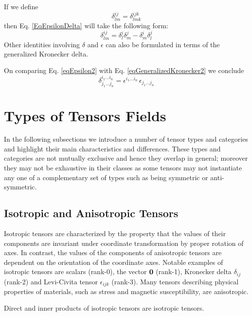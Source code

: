  If we define
\begin{equation}
\delta_{lm}^{ij}=\delta_{lmk}^{ijk}
\end{equation}
then Eq. \ref{EqEpsilonDelta} will take the following form:
\begin{equation}
\delta_{lm}^{ij}=\delta_{l}^{i}\delta_{m}^{j}-\delta_{m}^{i}\delta_{l}^{j}
\end{equation}
Other identities involving $\delta$ and $\epsilon$ can also be formulated
in terms of the generalized Kronecker delta.

 On comparing Eq. \ref{eqEpsilon2} with Eq. \ref{eqGeneralizedKronecker2}
we conclude
\begin{equation}
\delta_{j_{1}\ldots j_{n}}^{i_{1}\ldots i_{n}}=\epsilon^{i_{1}\ldots i_{n}}\,\epsilon_{j_{1}\ldots j_{n}}
\end{equation}



\section{Types of Tensors Fields}

 In the following subsections we introduce a number of tensor
types and categories and highlight their main characteristics and
differences. These types and categories are not mutually exclusive
and hence they overlap in general; moreover they may not be exhaustive
in their classes as some tensors may not instantiate any one of a
complementary set of types such as being symmetric or anti-symmetric.


\subsection{Isotropic and Anisotropic Tensors}

 Isotropic tensors are characterized by the property that
the values of their components are invariant under coordinate transformation
by proper rotation of axes. In contrast, the values of the components
of anisotropic tensors are dependent on the orientation of the coordinate
axes. Notable examples of isotropic tensors are scalars (rank-0),
the vector $\mathbf{ 0}$ (rank-1), Kronecker delta $\delta_{ij}$
(rank-2) and Levi-Civita tensor $\epsilon_{ijk}$ (rank-3). Many tensors
describing physical properties of materials, such as stress and magnetic
susceptibility, are anisotropic.

 Direct and inner products of isotropic tensors are isotropic
tensors.

